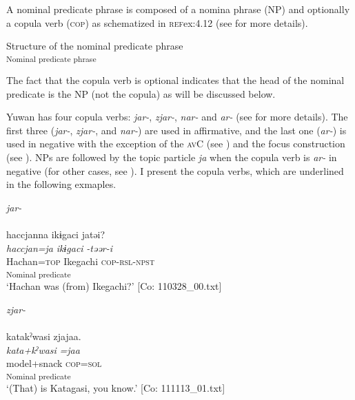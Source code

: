 A nominal predicate phrase is composed of a nomina phrase (NP) and optionally a copula verb (\textsc{cop}) as schematized in \textsc{ref}{ex:4.12} (see  for more details).

\ea  Structure of the nominal predicate phrase \label{ex:4.12}\\\textsubscript{Nominal predicate phrase}
\z

The fact that the copula verb is optional indicates that the head of the nominal predicate is the NP (not the copula) as will be discussed below.

Yuwan has four copula verbs: \textit{jar-}, \textit{zjar-}, \textit{nar-} and \textit{ar-} (see  for more details). The first three (\textit{jar-}, \textit{zjar-}, and \textit{nar-}) are used in affirmative, and the last one (\textit{ar-}) is used in negative with the exception of the \textsc{av}C (see ) and the focus construction (see ). NPs are followed by the topic particle \textit{ja} when the copula verb is \textit{ar-} in negative (for other cases, see ). I present the copula verbs, which are underlined in the following exmaples.

\ea \label{ex:4.13}
\ea   \textit{jar-} \label{ex:4.13a}\\\\
    \gllll haccjanna  ikɨgaci  jatəi?\\
      \textit{haccjan=ja}  \textit{ikɨgaci}  \textit{-təər-i}\\
      Hachan=\textsc{top}  Ikegachi  \textsc{cop}-\textsc{rsl}-\textsc{npst}\\
        [NP  Copular verb]\textsubscript{Nominal predicate}\\
    \glt       ‘Hachan was (from) Ikegachi?’      [Co: 110328\_00.txt]

\ex \textit{zjar-}\\\\
\gllll    katakˀwasi  zjajaa.\\
      \textit{kata+kˀwasi}  \textit{=jaa}\\
      model+snack  \textsc{cop}=\textsc{sol}\\
      [NP  Copular verb]\textsubscript{Nominal predicate}\\
      \glt       ‘(That) is Katagasi, you know.’ [Co: 111113\_01.txt]

